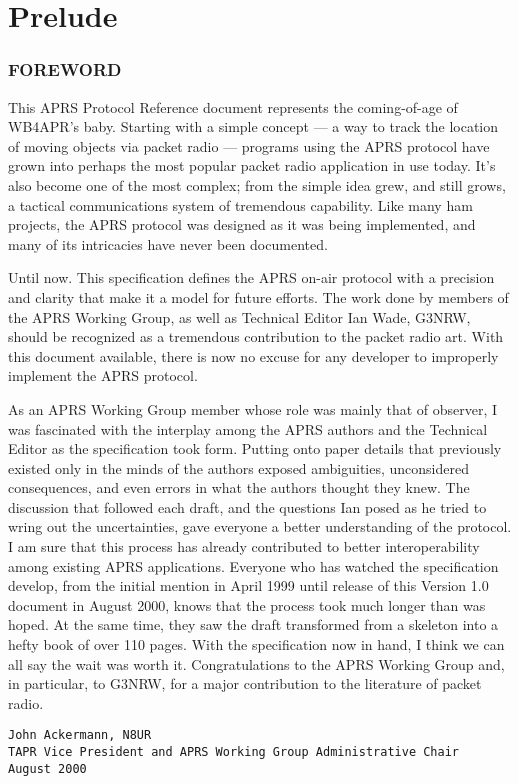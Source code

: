 
\part*{Prelude}

\section*{FOREWORD}

This APRS Protocol Reference document represents the coming-of-age of WB4APR’s baby.
Starting with a simple concept — a way to track the location of moving objects via packet radio
— programs using the APRS protocol have grown into perhaps the most popular packet radio
application in use today. It’s also become one of the most complex; from the simple idea grew,
and still grows, a tactical communications system of tremendous capability. Like many ham
projects, the APRS protocol was designed as it was being implemented, and many of its
intricacies have never been documented.

Until now. This specification defines the APRS on-air protocol with a precision and clarity that
make it a model for future efforts. The work done by members of the APRS Working Group, as
well as Technical Editor Ian Wade, G3NRW, should be recognized as a tremendous contribution
to the packet radio art. With this document available, there is now no excuse for any developer to
improperly implement the APRS protocol.

As an APRS Working Group member whose role was mainly that of observer, I was fascinated
with the interplay among the APRS authors and the Technical Editor as the specification took
form. Putting onto paper details that previously existed only in the minds of the authors exposed
ambiguities, unconsidered consequences, and even errors in what the authors thought they knew.
The discussion that followed each draft, and the questions Ian posed as he tried to wring out the
uncertainties, gave everyone a better understanding of the protocol. I am sure that this process has
already contributed to better interoperability among existing APRS applications.
Everyone who has watched the specification develop, from the initial mention in April 1999 until
release of this Version 1.0 document in August 2000, knows that the process took much longer
than was hoped. At the same time, they saw the draft transformed from a skeleton into a hefty
book of over 110 pages. With the specification now in hand, I think we can all say the wait was
worth it. Congratulations to the APRS Working Group and, in particular, to G3NRW, for a major
contribution to the literature of packet radio.

\begin{verbatim}
John Ackermann, N8UR
TAPR Vice President and APRS Working Group Administrative Chair
August 2000
\end{verbatim}


